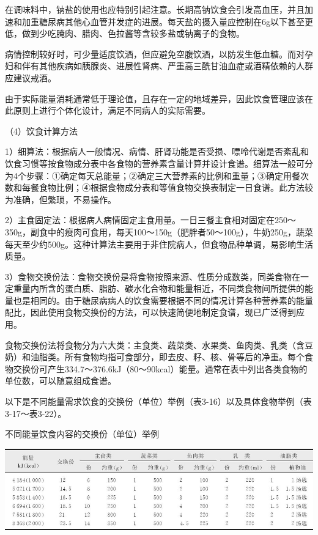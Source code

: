 在调味料中，钠盐的使用也应特别引起注意。长期高钠饮食会引发高血压，并且加速和加重糖尿病其他心血管并发症的进展。每天盐的摄入量应控制在6g以下甚至更低，做到少吃腌肉、腊肉、色拉酱等含较多盐或钠离子的食物。

病情控制较好时，可少量适度饮酒，但应避免空腹饮酒，以防发生低血糖。而对孕妇和伴有其他疾病如胰腺炎、进展性肾病、严重高三酰甘油血症或酒精依赖的人群应建议戒酒。

由于实际能量消耗通常低于理论值，且存在一定的地域差异，因此饮食管理应该在此原则上进行个体化设计，满足不同病人的实际需要。

（4）饮食计算方法

1）细算法：根据病人一般情况、病情、肝肾功能是否受损、嘌呤代谢是否紊乱和饮食习惯等按食物成分表中各食物的营养素含量计算并设计食谱。细算法一般可分为4个步骤：①确定每天总能量；②确定三大营养素的比例和重量；③确定用餐次数和每餐食物比例；④根据食物成分表和等值食物交换表制定一日食谱。此方法较为准确，但繁琐，不易操作。

2）主食固定法：根据病人病情固定主食用量。一日三餐主食相对固定在250～350g，副食中的瘦肉可食用，每天100～150g（肥胖者50～100g），牛奶250g，蔬菜每天至少约500g。这种计算法主要用于非住院病人，但食物品种单调，易影响生活质量。

3）食物交换份法：食物交换份是将食物按照来源、性质分成数类，同类食物在一定重量内所含的蛋白质、脂肪、碳水化合物和能量相近，不同类食物间所提供的能量也是相同的。由于糖尿病病人的饮食需要根据不同的情况计算各种营养素的能量配比，因此使用食物交换份的方法，可以快速简便地制定食谱，现已广泛得到应用。

食物交换份法将食物分为六大类：主食类、蔬菜类、水果类、鱼肉类、乳类（含豆奶）和油脂类。所有食物均指可食部分，即去皮、籽、核、骨等后的净重。每个食物交换份可产生334.7～376.6kJ（80～90kcal）能量。通常在表中列出各类食物的单位数，可以随意组成食谱。

以下是不同能量需求饮食的交换份（单位）举例（表3-16）以及具体食物举例（表3-17～表3-22）。

\begin{table}[htbp]
\centering
\caption{不同能量饮食内容的交换份（单位）举例}
\label{tab3-16}
\includegraphics{./images/Image00032.jpg}
\end{table}

